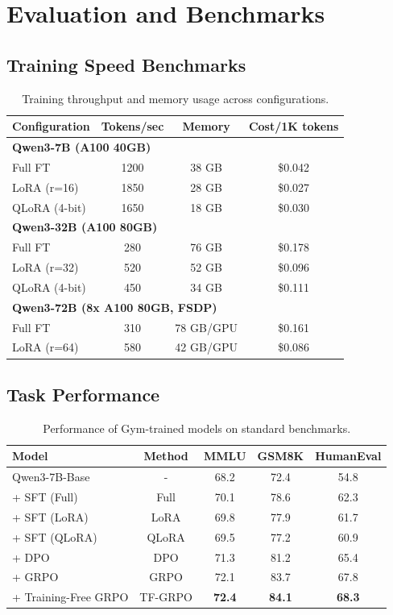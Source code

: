 \section{Evaluation and Benchmarks}


\subsection{Training Speed Benchmarks}

\begin{table}[h]
\centering
\begin{tabular}{lccc}
\toprule
Configuration & Tokens/sec & Memory & Cost/1K tokens \\
\midrule
\multicolumn{4}{l}{\textbf{Qwen3-7B (A100 40GB)}} \\
Full FT & 1200 & 38 GB & \$0.042 \\
LoRA (r=16) & 1850 & 28 GB & \$0.027 \\
QLoRA (4-bit) & 1650 & 18 GB & \$0.030 \\
\midrule
\multicolumn{4}{l}{\textbf{Qwen3-32B (A100 80GB)}} \\
Full FT & 280 & 76 GB & \$0.178 \\
LoRA (r=32) & 520 & 52 GB & \$0.096 \\
QLoRA (4-bit) & 450 & 34 GB & \$0.111 \\
\midrule
\multicolumn{4}{l}{\textbf{Qwen3-72B (8x A100 80GB, FSDP)}} \\
Full FT & 310 & 78 GB/GPU & \$0.161 \\
LoRA (r=64) & 580 & 42 GB/GPU & \$0.086 \\
\bottomrule
\end{tabular}
\caption{Training throughput and memory usage across configurations.}
\end{table}

\subsection{Task Performance}

\begin{table}[h]
\centering
\begin{tabular}{lcccc}
\toprule
Model & Method & MMLU & GSM8K & HumanEval \\
\midrule
Qwen3-7B-Base & - & 68.2 & 72.4 & 54.8 \\
+ SFT (Full) & Full & 70.1 & 78.6 & 62.3 \\
+ SFT (LoRA) & LoRA & 69.8 & 77.9 & 61.7 \\
+ SFT (QLoRA) & QLoRA & 69.5 & 77.2 & 60.9 \\
\midrule
+ DPO & DPO & 71.3 & 81.2 & 65.4 \\
+ GRPO & GRPO & 72.1 & 83.7 & 67.8 \\
+ Training-Free GRPO & TF-GRPO & \textbf{72.4} & \textbf{84.1} & \textbf{68.3} \\
\bottomrule
\end{tabular}
\caption{Performance of Gym-trained models on standard benchmarks.}
\end{table}


